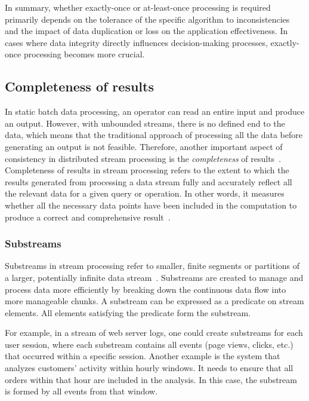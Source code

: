 In summary, whether exactly-once or at-least-once processing is required primarily depends on the tolerance of the specific algorithm to inconsistencies and the impact of data duplication or loss on the application effectiveness. In cases where data integrity directly influences decision-making processes, exactly-once processing becomes more crucial.

\subsection{Completeness of results}
\label{completeness}

In static batch data processing, an operator can read an entire input and produce an output. However, with unbounded streams, there is no defined end to the data, which means that the traditional approach of processing all the data before generating an output is not feasible. Therefore, another important aspect of consistency in distributed stream processing is the {\em completeness} of results~\cite{Tucker:2003:EPS:776752.776780}. Completeness of results in stream processing refers to the extent to which the results generated from processing a data stream fully and accurately reflect all the relevant data for a given query or operation. In other words, it measures whether all the necessary data points have been included in the computation to produce a correct and comprehensive result~\cite{akidau2015streaming}.

\subsubsection{Substreams}

Substreams in stream processing refer to smaller, finite segments or partitions of a larger, potentially infinite data stream~\cite{Tucker:2003:EPS:776752.776780}. Substreams are created to manage and process data more efficiently by breaking down the continuous data flow into more manageable chunks. A substream can be expressed as a predicate on stream elements. All elements satisfying the predicate form the substream.

For example, in a stream of web server logs, one could create substreams for each user session, where each substream contains all events (page views, clicks, etc.) that occurred within a specific session. Another example is the system that analyzes customers' activity within hourly windows. It needs to ensure that all orders within that hour are included in the analysis. In this case, the substream is formed by all events from that window.

